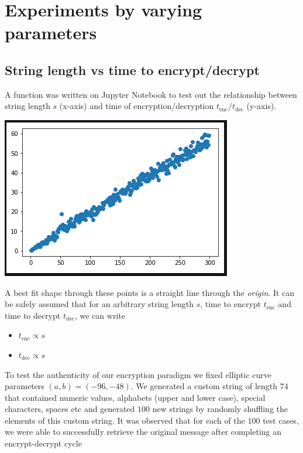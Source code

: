 \documentclass[a4paper,12pt]{article}
\begin{document}
\section{Experiments by varying parameters}
\subsection{String length vs time to encrypt/decrypt}
\begin{flushleft}
A function was written on Jupyter Notebook to test out the relationship between string length $s$ (x-axis) and time of encryption/decryption $t_{\text{enc}}/t_{\text{dec}}$ (y-axis).
\begin{center}
	\includegraphics[scale=0.75]{images/strlen vs time.png}
\end{center}

A best fit shape through these points is a straight line through the \textit{origin}. It can be safely assumed that for an arbitrary string length $s$, time to encrypt $t_{\text{enc}}$ and time to decrypt $t_{\text{dec}}$, we can write
\end{flushleft}

\begin{itemize}
	\centering
	\item $t_{\text{enc}}\propto s$
	\item $t_{\text{dec}}\propto s$
\end{itemize}

\begin{flushleft}
To test the authenticity of our encryption paradigm we fixed elliptic curve parameters $(a,b)=(-96,-48)$. We generated a custom string of length $74$ that contained numeric values, alphabets (upper and lower case), special characters, spaces etc and generated $100$ new strings by randomly shuffling the elements of this custom string. It was observed that for each of the $100$ test cases, we were able to successfully retrieve the original message after completing an encrypt-decrypt cycle
\end{flushleft}
\end{document}
